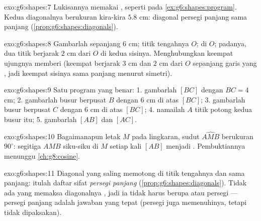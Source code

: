 \begin{solution}{exo:g6:shapes:7}
Lukisannya memakai , seperti pada
\cref{ex:g6:shapes:program}. Kedua diagonalnya berukuran kira-kira
$5.8$ cm: diagonal persegi panjang sama panjang
(\cref{prop:g6:shapes:diagonals}).
\end{solution}

\begin{solution}{exo:g6:shapes:8}
Gambarlah  sepanjang $6$ cm; titik tengahnya $O$;  di $O$; padanya, dua titik berjarak $2$ cm dari $O$ di
kedua sisinya. Menghubungkan keempat ujungnya memberi 
(keempat  berjarak $3$ cm dan $2$ cm dari $O$ sepanjang
garis yang , jadi keempat sisinya sama panjang menurut simetri).
\end{solution}

\begin{solution}{exo:g6:shapes:9}
Satu program yang benar:
1. gambarlah  $[BC]$ dengan $BC = 4$ cm;
2. gambarlah busur berpusat $B$ dengan  $6$ cm di atas $[BC]$;
3. gambarlah busur berpusat $C$ dengan  $6$ cm di atas $[BC]$;
4. namailah $A$ titik potong kedua busur itu;
5. gambarlah  $[AB]$ dan $[AC]$.
\end{solution}

\begin{solution}{exo:g6:shapes:10}
Bagaimanapun letak $M$ pada lingkaran, sudut $\widehat{AMB}$ berukuran
$90^\circ$: segitiga $AMB$ siku-siku di $M$ setiap kali $[AB]$ menjadi
. Pembuktiannya menunggu \cref{ch:g8:cosine}.
\end{solution}

\begin{solution}{exo:g6:shapes:11}
Diagonal yang saling memotong di titik tengahnya dan sama panjang:
itulah daftar sifat \emph{persegi panjang}
(\cref{prop:g6:shapes:diagonals}). Tidak ada yang memaksa diagonalnya
, jadi ia tidak harus berupa  atau persegi ---
persegi panjang adalah jawaban yang tepat (persegi juga memenuhinya,
tetapi tidak dipaksakan).
\end{solution}

